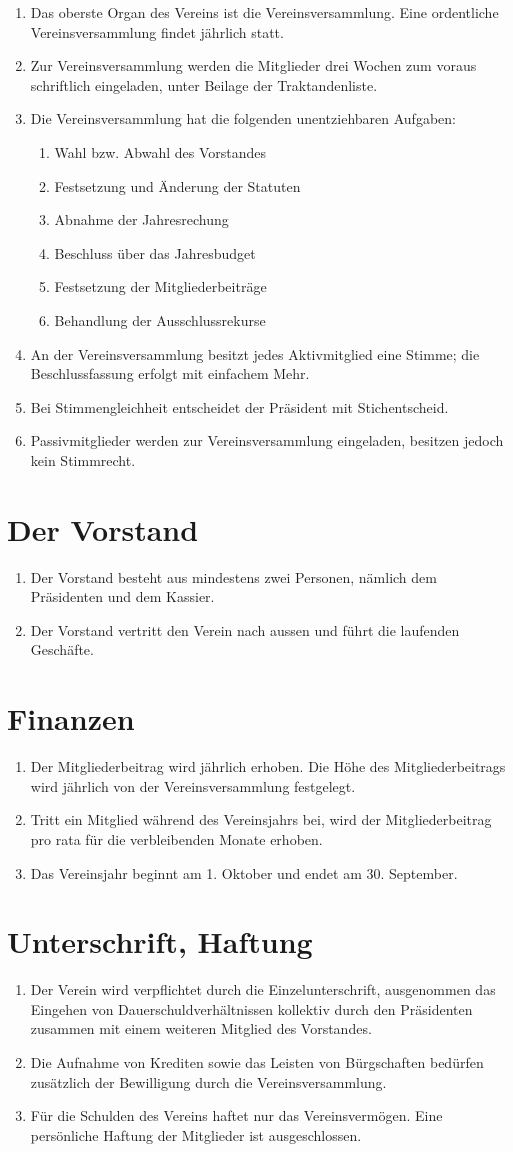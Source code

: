 \documentclass[10pt,a4paper,parskip,fleqn]{scrartcl}
\newcommand{\ol}{\begin{enumerate}[itemsep=-0.2em,topsep=-0.2em]}
\newcommand{\lo}{\end{enumerate}}
\newcommand{\li}{\item}
\begin{document}
\ol
	\li Das oberste Organ des Vereins ist die Vereinsversammlung. Eine ordentliche
	Vereinsversammlung findet jährlich statt.
	\li Zur Vereinsversammlung werden die Mitglieder drei Wochen zum voraus
	schriftlich eingeladen, unter Beilage der Traktandenliste.
	\li Die Vereinsversammlung hat die folgenden unentziehbaren Aufgaben:
		\ol
			\li Wahl bzw. Abwahl des Vorstandes
			\li Festsetzung und Änderung der Statuten
			\li Abnahme der Jahresrechung
			\li Beschluss über das Jahresbudget
			\li Festsetzung der Mitgliederbeiträge
			\li Behandlung der Ausschlussrekurse
		\lo
	\li An der Vereinsversammlung besitzt jedes Aktivmitglied eine Stimme; die
	Beschlussfassung erfolgt mit einfachem Mehr.
	\li Bei Stimmengleichheit entscheidet der Präsident mit Stichentscheid.
	\li Passivmitglieder werden zur Vereinsversammlung eingeladen, besitzen jedoch
	kein Stimmrecht.
\lo


\section{Der Vorstand}

\ol
	\li Der Vorstand besteht aus mindestens zwei Personen, nämlich dem Präsidenten
	und dem Kassier.
	\li Der Vorstand vertritt den Verein nach aussen und führt die laufenden
	Geschäfte.
\lo


\section{Finanzen}

\ol
	\li Der Mitgliederbeitrag wird jährlich erhoben. Die Höhe des
	Mitgliederbeitrags wird jährlich von der Vereinsversammlung festgelegt.
	\li Tritt ein Mitglied während des Vereinsjahrs bei, wird der
	Mitgliederbeitrag pro rata für die verbleibenden Monate erhoben.
	\li Das Vereinsjahr beginnt am 1. Oktober und endet am 30. September.
\lo


\section{Unterschrift, Haftung}

\ol
	\li Der Verein wird verpflichtet durch die Einzelunterschrift, ausgenommen das
	Eingehen von Dauerschuldverhältnissen kollektiv durch den Präsidenten zusammen
	mit einem weiteren Mitglied des Vorstandes.
	\li Die Aufnahme von Krediten sowie das Leisten von Bürgschaften bedürfen
	zusätzlich der Bewilligung durch die Vereinsversammlung.
	\li Für die Schulden des Vereins haftet nur das Vereinsvermögen. Eine
	persönliche Haftung der Mitglieder ist ausgeschlossen.
\lo
\end{document}
